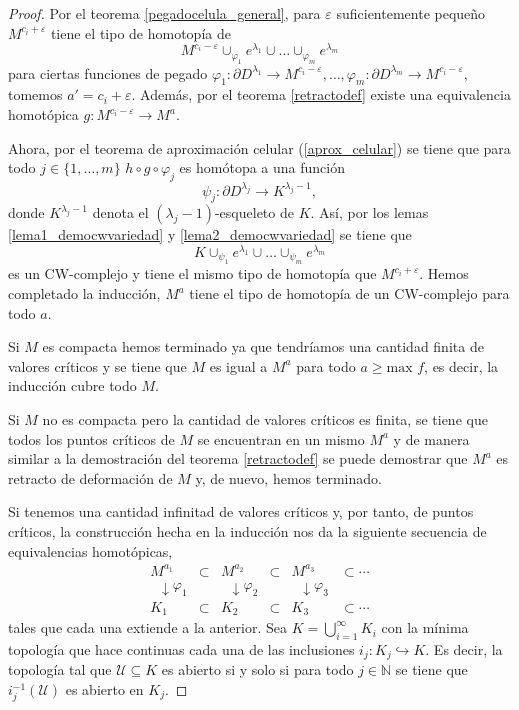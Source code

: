 \begin{proof}
    Por el teorema \ref{pegadocelula_general}, para $\varepsilon$ suficientemente pequeño $M^{c_i+\varepsilon}$ tiene el tipo de homotopía de 
    \begin{equation*}
        M^{c_i - \varepsilon}\cup_{\varphi_1} e^{\lambda_1} \cup\dots\cup_{\varphi_m} e^{\lambda_m}
    \end{equation*}
    para ciertas funciones de pegado $\varphi_1:\partial D^{\lambda_1}\to M^{c_i - \varepsilon},\dots,\varphi_m: \partial D^{\lambda_m}\to M^{c_i - \varepsilon}$, tomemos $a'=c_i+\varepsilon$. Además, por el teorema \ref{retractodef} existe una equivalencia homotópica $g: M^{c_i-\varepsilon}\to M^a$.

    Ahora, por el teorema de aproximación celular (\ref{aprox_celular}) se tiene que para todo $j\in\{1,\dots,m\}$ $h\circ g\circ\varphi_j$ es homótopa a una función
    \begin{equation*}
        \psi_j: \partial D^{\lambda_j} \to K^{\lambda_j - 1},
    \end{equation*}
    donde $K^{\lambda_j - 1}$ denota el $(\lambda_j -1)$-esqueleto de $K$. Así, por los lemas \ref{lema1_democwvariedad} y \ref{lema2_democwvariedad} se tiene que 
    \begin{equation*}
        K\cup_{\psi_1} e^{\lambda_1} \cup\dots\cup_{\psi_m} e^{\lambda_m}
    \end{equation*}
    es un CW-complejo y tiene el mismo tipo de homotopía que $M^{c_i+\varepsilon}$. Hemos completado la inducción, $M^a$ tiene el tipo de homotopía de un CW-complejo para todo $a$.

    Si $M$ es compacta hemos terminado ya que tendríamos una cantidad finita de valores críticos y se tiene que $M$ es igual a $M^a$ para todo $a\ge \text{max }f$, es decir, la inducción cubre todo $M$.

    Si $M$ no es compacta pero la cantidad de valores críticos es finita, se tiene que todos los puntos críticos de $M$ se encuentran en un mismo $M^a$ y de manera similar a la demostración del teorema \ref{retractodef} se puede demostrar que $M^a$ es retracto de deformación de $M$ y, de nuevo, hemos terminado.

    Si tenemos una cantidad infinitad de valores críticos y, por tanto, de puntos críticos, la construcción hecha en la inducción nos da la siguiente secuencia de equivalencias homotópicas,
    \[
        \begin{array}{cccccc}
            M^{a_1} & \subset & M^{a_2} & \subset & M^{a_3} & \subset \cdots \\
            \;\;\downarrow{\varphi_1} & & \;\;\downarrow{\varphi_2} & & \;\;\downarrow{\varphi_3} & \\
            K_1 & \subset & K_2 & \subset & K_3 & \subset \cdots
        \end{array}
    \]
    tales que cada una extiende a la anterior. Sea $K=\bigcup_{i=1}^{\infty} K_i$ con la mínima topología que hace continuas cada una de las inclusiones $i_j:K_j\hookrightarrow K$. Es decir, la topología tal que $\mathcal{U}\subseteq K$ es abierto si y solo si para todo $j\in \mathbb{N}$ se tiene que $i_j^{-1}(\mathcal{U})$ es abierto en $K_j$. 
    

\end{proof}
